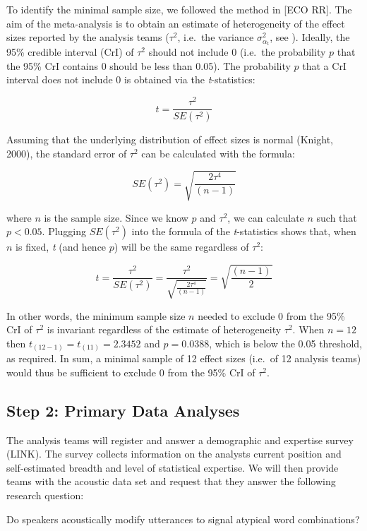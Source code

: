 \documentclass[
  english,
  man,floatsintext]{apa6}
\begin{document}
To identify the minimal sample size, we followed the method in {[}ECO RR{]}.
The aim of the meta-analysis is to obtain an estimate of heterogeneity of the effect sizes reported by the analysis teams (\(\tau^2\), i.e.~the variance \(\sigma^2_{\alpha_{\text{t}}}\), see ).
Ideally, the 95\% credible interval (CrI) of \(\tau^2\) should not include 0 (i.e.~the probability \(p\) that the 95\% CrI contains 0 should be less than 0.05).
The probability \(p\) that a CrI interval does not include 0 is obtained via the \emph{t}-statistics:

\[t = \frac{\tau^2}{SE(\tau^2)}\]

Assuming that the underlying distribution of effect sizes is normal (Knight, 2000), the standard error of \(\tau^2\) can be calculated with the formula:

\[SE(\tau^2) = \sqrt{\frac{2\tau^4}{(n-1)}}\]

where \(n\) is the sample size.
Since we know \(p\) and \(\tau^2\), we can calculate \(n\) such that \(p < 0.05\).
Plugging \(SE(\tau^2)\) into the formula of the \emph{t}-statistics shows that, when \(n\) is fixed, \emph{t} (and hence \(p\)) will be the same regardless of \(\tau^2\):

\[t = \frac{\tau^2}{SE(\tau^2)} = \frac{\tau^2}{\sqrt{\frac{2\tau^4}{(n-1)}}} = \sqrt{\frac{(n-1)}{2}}\]

In other words, the minimum sample size \(n\) needed to exclude 0 from the 95\% CrI of \(\tau^2\) is invariant regardless of the estimate of heterogeneity \(\tau^2\).
When \(n = 12\) then \(t_{(12-1)} = t_{(11)} = 2.3452\) and \(p = 0.0388\), which is below the 0.05 threshold, as required.
In sum, a minimal sample of 12 effect sizes (i.e.~of 12 analysis teams) would thus be sufficient to exclude 0 from the 95\% CrI of \(\tau^2\).

\hypertarget{step-2-primary-data-analyses}{%
\subsection{Step 2: Primary Data Analyses}\label{step-2-primary-data-analyses}}

The analysis teams will register and answer a demographic and expertise survey (LINK).
The survey collects information on the analysts current position and self-estimated breadth and level of statistical expertise.
We will then provide teams with the acoustic data set and request that they answer the following research question:

Do speakers acoustically modify utterances to signal atypical word combinations?
\end{document}
